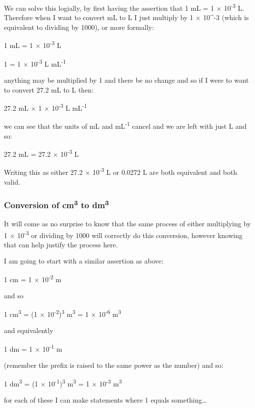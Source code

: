 \documentclass[
]{book}
\begin{document}
We can solve this logially, by first having the assertion that 1 mL = 1 × 10\textsuperscript{-3} L. Therefore when I want to convert mL to L I just multiply by 1 × 10\^{}-3 (which is equivalent to dividing by 1000), or more formally:

1 mL = 1 × 10\textsuperscript{-3} L

1 = 1 × 10\textsuperscript{-3} L mL\textsuperscript{-1}

anything may be multiplied by 1 and there be no change and so if I were to want to convert 27.2 mL to L then:

27.2 mL × 1 × 10\textsuperscript{-3} L mL\textsuperscript{-1}

we can see that the units of mL and mL\textsuperscript{-1} cancel and we are left with just L and so:

27.2 mL = 27.2 × 10\textsuperscript{-3} L

Writing this as either 27.2 × 10\textsuperscript{-3} L or 0.0272 L are both equivalent and both valid.

\hypertarget{conversion-of-cm3-to-dm3}{%
\subsubsection{\texorpdfstring{Conversion of cm\textsuperscript{3} to dm\textsuperscript{3}}{Conversion of cm3 to dm3}}\label{conversion-of-cm3-to-dm3}}

It will come as no surprise to know that the same process of either multiplying by 1 × 10\textsuperscript{-3} or dividing by 1000 will correctly do this conversion, however knowing that can help justify the process here.

I am going to start with a similar assertion as above:

1 cm = 1 × 10\textsuperscript{-2} m

and so

1 cm\textsuperscript{3} = (1 × 10\textsuperscript{-2})\textsuperscript{3} m\textsuperscript{3} = 1 × 10\textsuperscript{-6} m\textsuperscript{3}

and equivalently

1 dm = 1 × 10\textsuperscript{-1} m

(remember the prefix is raised to the same power as the number) and so:

1 dm\textsuperscript{3} = (1 × 10\textsuperscript{-1})\textsuperscript{3} m\textsuperscript{3} = 1 × 10\textsuperscript{-3} m\textsuperscript{3}

for each of these I can make statements where 1 equals something\ldots{}
\end{document}
